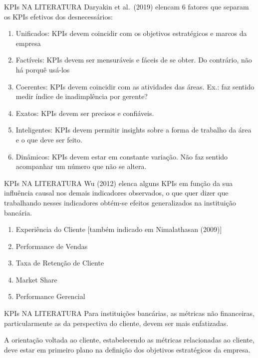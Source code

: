 \documentclass[
  ignorenonframetext,
]{beamer}
\providecommand{\tightlist}{%
  \setlength{\itemsep}{0pt}\setlength{\parskip}{0pt}}\usepackage{longtable,booktabs,array}
\begin{document}
\begin{frame}{KPIs NA LITERATURA}
\protect\hypertarget{kpis-na-literatura-2}{}
Daryakin et al.~(2019) elencam 6 fatores que separam os KPIs efetivos
dos desnecessários:

\begin{enumerate}
\tightlist
\item
  Unificados: KPIs devem coincidir com os objetivos estratégicos e
  marcos da empresa
\item
  Factíveis: KPIs devem ser mensuráveis e fáceis de se obter. Do
  contrário, não há porquê usá-los
\item
  Coerentes: KPIs devem coincidir com as atividades das áreas. Ex.: faz
  sentido medir índice de inadimplência por gerente?
\item
  Exatos: KPIs devem ser precisos e confiáveis.
\item
  Inteligentes: KPIs devem permitir insights sobre a forma de trabalho
  da área e o que deve ser feito.
\item
  Dinâmicos: KPIs devem estar em constante variação. Não faz sentido
  acompanhar um número que não se altera.
\end{enumerate}
\end{frame}

\begin{frame}{KPIs NA LITERATURA}
\protect\hypertarget{kpis-na-literatura-3}{}
Wu (2012) elenca alguns KPIs em função da sua influência causal nos
demais indicadores observados, o que quer dizer que trabalhando nesses
indicadores obtém-se efeitos generalizados na instituição bancária.

\begin{enumerate}
\tightlist
\item
  Experiência do Cliente {[}também indicado em Nimalathasan (2009){]}
\item
  Performance de Vendas
\item
  Taxa de Retenção de Cliente
\item
  Market Share
\item
  Performance Gerencial
\end{enumerate}
\end{frame}

\begin{frame}{KPIs NA LITERATURA}
\protect\hypertarget{kpis-na-literatura-4}{}
Para instituições bancárias, as métricas não financeiras,
particularmente as da perspectiva do cliente, devem ser mais
enfatizadas.

A orientação voltada ao cliente, estabelecendo as métricas relacionadas
ao cliente, deve estar em primeiro plano na definição dos objetivos
estratégicos da empresa.
\end{frame}
\end{document}

